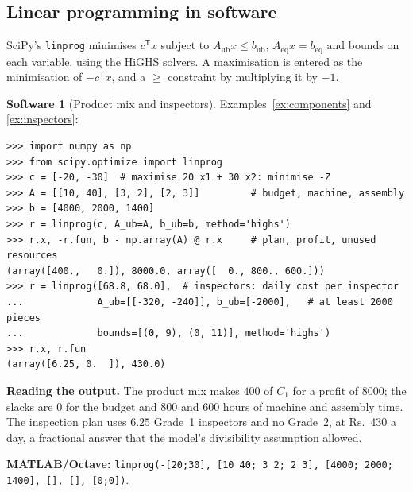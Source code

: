 \documentclass[11pt,a4paper]{article}
\numberwithin{equation}{section}
\theoremstyle{definition}
\newtheorem{software}[thm]{Software}
\begin{document}
\subsection{Linear programming in software}
\label{ssec:software1}

SciPy's \texttt{linprog} minimises $c^{\mathsf T}x$ subject to $A_{\text{ub}}x \leq b_{\text{ub}}$, $A_{\text{eq}}x = b_{\text{eq}}$ and bounds on each variable, using the HiGHS solvers. A maximisation is entered as the minimisation of $-c^{\mathsf T}x$, and a $\geq$ constraint by multiplying it by $-1$.

\begin{software}[Product mix and inspectors]
\label{sw:productmix}
Examples~\ref{ex:components} and \ref{ex:inspectors}:
{\small\begin{verbatim}
>>> import numpy as np
>>> from scipy.optimize import linprog
>>> c = [-20, -30]  # maximise 20 x1 + 30 x2: minimise -Z
>>> A = [[10, 40], [3, 2], [2, 3]]         # budget, machine, assembly
>>> b = [4000, 2000, 1400]
>>> r = linprog(c, A_ub=A, b_ub=b, method='highs')
>>> r.x, -r.fun, b - np.array(A) @ r.x     # plan, profit, unused resources
(array([400.,   0.]), 8000.0, array([  0., 800., 600.]))
>>> r = linprog([68.8, 68.0],  # inspectors: daily cost per inspector
...             A_ub=[[-320, -240]], b_ub=[-2000],   # at least 2000 pieces
...             bounds=[(0, 9), (0, 11)], method='highs')
>>> r.x, r.fun
(array([6.25, 0.  ]), 430.0)
\end{verbatim}}
\textbf{Reading the output.} The product mix makes $400$ of $C_1$ for a profit of $8000$; the slacks are $0$ for the budget and $800$ and $600$ hours of machine and assembly time. The inspection plan uses $6.25$ Grade~1 inspectors and no Grade~2, at Rs.~430 a day, a fractional answer that the model's divisibility
assumption allowed.

\textbf{MATLAB/Octave:} \texttt{linprog(-[20;30], [10 40; 3 2; 2 3], [4000; 2000; 1400], [], [], [0;0])}.
\end{software}
\end{document}

